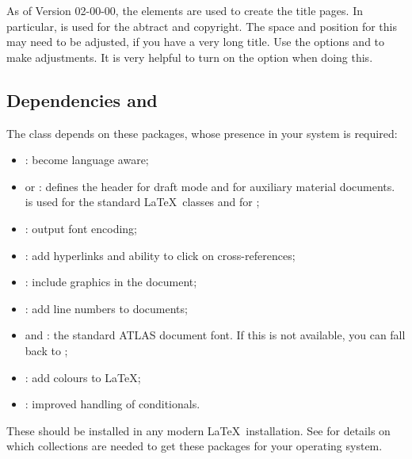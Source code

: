 As of  Version 02-00-00,
the \KOMAScript elements are used to create the title pages.
In particular,  is used for the abtract and copyright.
The space and position for this may need to be adjusted,
if you have a very long title. Use the options
 and  to make adjustments.
It is very helpful to turn on the  option when doing this.


\subsection{Dependencies and }
\label{sec:atlaspackage}

The  class depends on these packages, whose presence in
your system is required:
\begin{itemize}\setlength{\parskip}{0pt}\setlength{\itemsep}{0pt}
\item {}: become language aware;
\item {} or : defines the header for draft mode
  and for auxiliary material documents.
   is used for the standard \LaTeX\ classes and
   for \KOMAScript;
\item {}: output font encoding;
\item {}: add hyperlinks and ability to click on cross-references;
\item {}: include graphics in the document;
\item {}: add line numbers to documents;
\item {} and : the standard ATLAS document font.
  If this is not available, you can fall back to ;
\item {}: add colours to \LaTeX;
\item {}: improved handling of conditionals.
\end{itemize}
These should be installed in any modern \LaTeX\ installation.
See \cite{latex-faq} for details on which collections are needed to get these packages
for your operating system.

